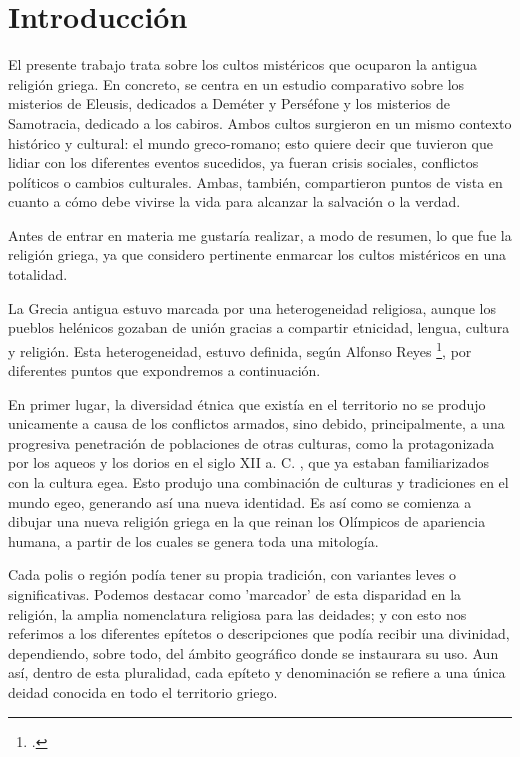 \chapter{Introducción}

El presente trabajo trata sobre los cultos mistéricos que ocuparon la antigua religión griega. En concreto, se centra en un estudio comparativo sobre los misterios de Eleusis, dedicados a Deméter y Perséfone y los misterios de Samotracia, dedicado a los cabiros. Ambos cultos surgieron en un mismo contexto histórico y cultural: el mundo greco-romano; esto quiere decir que tuvieron que lidiar con los diferentes eventos sucedidos, ya fueran crisis sociales, conflictos políticos o cambios culturales. Ambas, también, compartieron puntos de vista en cuanto a cómo debe vivirse la vida para alcanzar la salvación o la verdad.

Antes de entrar en materia me gustaría realizar, a modo de resumen, lo que fue la religión griega, ya que considero pertinente enmarcar los cultos mistéricos en una totalidad.

La Grecia antigua estuvo marcada por una heterogeneidad religiosa, aunque los pueblos helénicos gozaban de unión gracias a compartir etnicidad, lengua, cultura y religión. Esta heterogeneidad, estuvo definida, según Alfonso Reyes \footcites{reyesReligionGriega2018}, por diferentes puntos que expondremos a continuación.

En primer lugar, la diversidad étnica que existía en el territorio no se produjo unicamente a causa de los conflictos armados, sino debido, principalmente, a una progresiva penetración de poblaciones de otras culturas, como la protagonizada por los aqueos y los dorios en el siglo XII a. C. , que ya estaban familiarizados con la cultura egea. Esto produjo una combinación de culturas y tradiciones en el mundo egeo, generando así una nueva identidad. Es así como se comienza a dibujar una nueva religión griega en la que reinan los Olímpicos de apariencia humana, a partir de los cuales se genera toda una mitología.

Cada polis o región podía tener su propia tradición, con variantes leves o significativas. Podemos destacar como 'marcador' de esta disparidad en la religión, la amplia nomenclatura religiosa para las deidades; y con esto nos referimos a los diferentes epítetos o descripciones que podía recibir una divinidad, dependiendo, sobre todo, del ámbito geográfico donde se instaurara su uso. Aun así, dentro de esta pluralidad, cada epíteto y denominación se refiere a una única deidad conocida en todo el territorio griego. 

